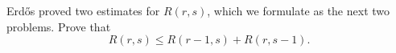 Erdős proved two estimates for $R(r, s)$, which we formulate as the next two problems. Prove that
\[ R(r, s) \leq R(r - 1, s) + R(r, s - 1). \tag{1} \]
